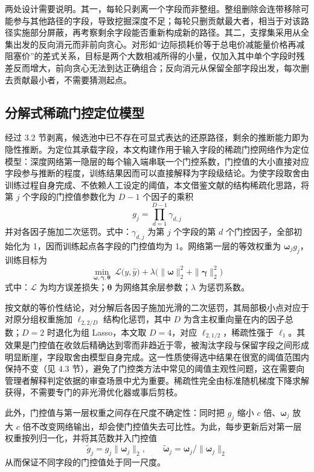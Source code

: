 \documentclass[UTF8,zihao=5,twoside]{ctexart}
\begin{document}
两处设计需要说明。其一，每轮只剥离一个字段而非整组。整组删除会连带移除可能参与其他路径的字段，导致挖掘深度不足；每轮只删贡献最大者，相当于对该路径实施部分屏蔽，再考察剩余字段能否重新构成新的路径。其二，支撑集采用从全集出发的反向消元而非前向贪心。对形如“边际损耗价等于总电价减能量价格再减阻塞价”的差式关系，目标是两个大数相减所得的小量，仅加入其中单个字段时残差反而增大，前向贪心无法到达正确组合；反向消元从保留全部字段出发，每次删去贡献最小者，不需要猜测起点。

\subsection{分解式稀疏门控定位模型}

经过 3.2 节剥离，候选池中已不存在可显式表达的还原路径，剩余的推断能力即为隐性推断。为定位其承载字段，本文构建作用于输入字段的稀疏门控网络作为定位模型：深度网络第一隐层的每个输入端串联一个门控系数，门控值的大小直接对应字段参与推断的程度，训练结果因而可以直接解释为字段级结论。为使字段取舍由训练过程自身完成、不依赖人工设定的阈值，本文借鉴文献\cite{ref-dgating}的结构稀疏化思路，将第 $j$ 个字段的门控值参数化为 $D-1$ 个因子的乘积
\begin{equation}
g_j=\prod_{d=1}^{D-1}\gamma_{d,j}
\end{equation}
并对各因子施加二次惩罚。式中：$\gamma_{d,j}$ 为第 $j$ 个字段的第 $d$ 个门控因子，全部初始化为 1，因而训练起点各字段的门控值均为 1。网络第一层的等效权重为 $\bm{\omega}_j g_j$，训练目标为
\begin{equation}
\min_{\bm{\omega},\bm{\gamma},\bm{\theta}}\ \mathcal{L}\big(y,\hat y\big)
+\lambda\Big(\|\bm{\omega}\|_2^2+\|\bm{\gamma}\|_2^2\Big)
\end{equation}
式中：$\mathcal{L}$ 为均方误差损失；$\bm{\theta}$ 为网络其余层参数；$\lambda$ 为惩罚系数。

按文献\cite{ref-dgating}的等价性结论，对分解后各因子施加光滑的二次惩罚，其局部极小点对应于对原分组权重施加 $\ell_{2,2/D}$ 结构化惩罚，其中 $D$ 为含主权重向量在内的因子总数；$D=2$ 时退化为组 Lasso，本文取 $D=4$，对应 $\ell_{2,1/2}$，稀疏性强于 $\ell_1$。其效果是门控值在收敛后精确达到零而非趋近于零，被淘汰字段与保留字段之间形成明显断崖，字段取舍由模型自身完成。这一性质使得选中结果在很宽的阈值范围内保持不变（见 4.3 节），避免了门控类方法中常见的阈值主观性问题，这在需要向管理者解释判定依据的审查场景中尤为重要。稀疏性完全由标准随机梯度下降求解获得，不需要专门的非光滑优化器或事后剪枝。

此外，门控值与第一层权重之间存在尺度不确定性：同时把 $g_j$ 缩小 $c$ 倍、$\bm{\omega}_j$ 放大 $c$ 倍不改变网络输出，却会使门控值失去可比性。为此，每步更新后对第一层权重按列归一化，并将其范数并入门控值
\begin{equation}
\tilde g_j=g_j\|\bm{\omega}_j\|_2,\qquad
\tilde{\bm{\omega}}_j=\bm{\omega}_j/\|\bm{\omega}_j\|_2
\end{equation}
从而保证不同字段的门控值处于同一尺度。
\end{document}
